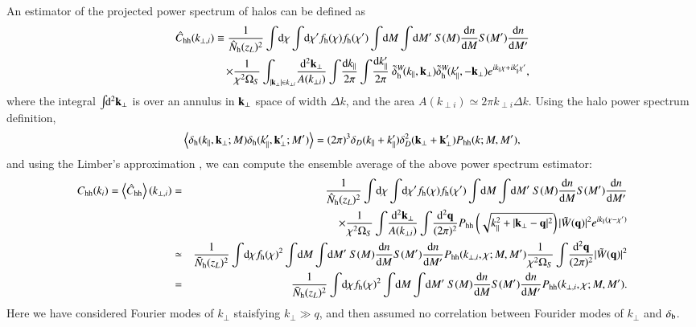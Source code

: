 \documentclass[onecolumn,notitlepage,showpacs,amsmath,amssymb,prd,floatfix]{revtex4-1}
\def\ave#1{\left\langle #1 \right\rangle}
\newcommand{\bk}{{\bf k}}
\newcommand{\bq}{{\bf q}}
\newcommand{\tW}{\tilde{W}}
\newcommand{\dr}{\mathrm{d}}
\newcommand{\deltab}{\delta_{\rm b}}
\newcommand{\tdeltam}{\tilde{\delta}_{\mathrm{m}}}
\newcommand{\deltah}{\delta_{\mathrm{h}}}
\newcommand{\phh}{P_{\mathrm{hh}}}
\newcommand{\chh}{C_{\mathrm{hh}}}
\newcommand{\hchh}{\hat{C}_{\mathrm{hh}}}
\newcommand{\bh}{\mathrm{h}}
\newcommand{\bnh}{\frac{\dr n}{\dr M}}
\newcommand{\bnhd}{\frac{\dr n}{\dr M'}}
\newcommand{\hNh}{\hat{N}_{\rm h}}
\newcommand{\bNh}{\bar{N}_{\rm h}}
\newcommand{\tdeltah}{\tilde{\delta}_{\rm h}}
\begin{document}
An estimator of the projected power spectrum of halos can be defined as
%
\begin{eqnarray}
\hchh(k_{\perp,i})\equiv
 \frac{1}{\hNh(z_L)^2}\int\!\dr\chi\int\!\dr\chi'
 f_\bh(\chi)f_\bh(\chi')
 \int\!\dr M\int\!\dr M'~S(M)\bnh S(M')\bnhd\nonumber\\
 \times
\frac{1}{\chi^2\Omega_S}\int_{|\bk_\perp|\in k_{\perp i}}\!\frac{\dr^2\bk_{\perp}}{A(k_{\perp
i})}\int\!\frac{\dr k_\parallel}{2\pi}\int\!\frac{\dr k'_{\parallel}}{2\pi}
~\tdeltah^W\!(k_\parallel,\bk_\perp)\tdeltah^W\!(k'_\parallel,-\bk_\perp)
e^{ik_\parallel\chi+ik'_\parallel\chi'},
\label{eq:e_chh}
\end{eqnarray}
%
where the integral $\int\!\!\dr^2\bk_\perp$ is over an annulus in
$\bk_\perp$ space of width $\Delta k$, and the area $A(k_{\perp
i})\simeq 2\pi k_{\perp i}\Delta k$.  Using the halo power spectrum
definition,
%
\begin{equation}
 \ave{\deltah(k_\parallel,\bk_\perp;M)\deltah(k'_\parallel,\bk'_{\perp};M')}=(2\pi)^3
  \delta_D(k_\parallel+k'_\parallel)\delta_D^2(\bk_\perp+\bk'_\perp)\phh(k;M,M'), 
\end{equation}
%
and using the Limber's approximation \cite{Limber:54},
we can compute the ensemble
average of the above power spectrum estimator:
%
\begin{eqnarray}
\chh(k_i)=\ave{\hchh}(k_{\perp, i})&=&
   \frac{1}{\hNh(z_L)^2}\int\!\dr\chi\int\!\dr\chi'
 f_\bh(\chi)f_\bh(\chi')
 \int\!\dr M\int\!\dr M'~S(M)\bnh S(M')\bnhd\nonumber\\
&&\hspace{4em} \times
\frac{1}{\chi^2\Omega_S}\int\!\frac{\dr^2\bk_{\perp}}{A(k_{\perp
i})}\int\!\frac{\dr^2\bq}{(2\pi)^2}
\phh\left(\sqrt{k_\parallel^2+|\bk_\perp-\bq|^2}\right)
|\tW(\bq)|^2e^{ik_\parallel(\chi-\chi')}
\nonumber\\
 &\simeq&\frac{1}{\bNh(z_L)^2}\int\!\dr\chi
  f_\bh(\chi)^2\int\!\dr M\int\!\dr M'~S(M)\bnh S(M')\bnhd
  \phh(k_{\perp,i},\chi;M,M')
  \frac{1}{\chi^2\Omega_S}\int\!\frac{\dr^2\bq}{(2\pi)^2}|\tW(\bq)|^2
\nonumber\\
 &=&\frac{1}{\bNh(z_L)^2}\int\!\dr\chi
  f_\bh(\chi)^2\int\!\dr M\int\!\dr M'~S(M)\bnh S(M')\bnhd
  \phh(k_{\perp,i},\chi; M, M').
  \label{eq:ave_hchh}
\end{eqnarray}
%
Here we have considered Fourier modes of $k_\perp$ staisfying $k_\perp \gg
q$, and then assumed no correlation between Fourider modes of $k_\perp$
and $\deltab$.
\end{document}
